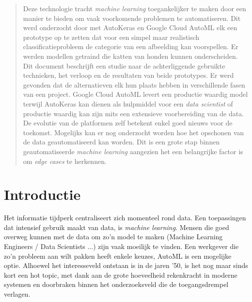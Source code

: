 \documentclass[a0,portrait]{a0poster}
\begin{document}
\begin{multicols}{2} %


\color{HoGentAccent1} %

\begin{abstract}
Deze technologie tracht \textit{machine learning} toegankelijker te maken door een manier te bieden om vaak voorkomende problemen te automatiseren. Dit werd onderzocht door met AutoKeras en Google Cloud AutoML elk een prototype op te zetten dat voor een simpel maar realistisch classificatieprobleem de categorie van een afbeelding kan voorspellen. Er werden modellen getraind die katten van honden kunnen onderscheiden. Dit document beschrijft een studie naar de achterliggende gebruikte technieken, het verloop en de resultaten van beide prototypes. Er werd gevonden dat de alternatieven elk hun plaats hebben in verschillende fasen van een project. Google Cloud AutoML levert een productie waardig model terwijl AutoKeras kan dienen als hulpmiddel voor een \textit{data scientist} of productie waardig kan zijn mits een extensieve voorbereiding van de data. De evolutie van de platformen zelf betekent enkel goed nieuws voor de toekomst. Mogelijks kan er nog onderzocht worden hoe het opschonen van de data geautomatiseerd kan worden. Dit is een grote stap binnen geautomatiseerde \textit{machine learning} aangezien het een belangrijke factor is om \textit{edge cases} te herkennen.
\end{abstract}

\color{HoGentAccent1} 
\section*{Introductie}
\color{black}
\color{black}

Het informatie tijdperk centraliseert zich momenteel rond data. Een toepassingen dat intensief gebruik maakt van data, is \textit{machine learning}. Mensen die goed overweg kunnen met de data om zo'n model te maken (Machine Learning Engineers / Data Scientists ...)  zijn vaak moeilijk te vinden. Een werkgever die zo'n probleem aan wilt pakken heeft enkele keuzes, AutoML is een mogelijke optie. Alhoewel het interesseveld ontstaan is in de jaren '50, is het nog maar sinds kort een hot topic, met dank aan de grote hoeveelheid rekenkracht in moderne systemen en doorbraken binnen het onderzoeksveld die de toegangsdrempel verlagen.


\end{multicols}
\end{document}
